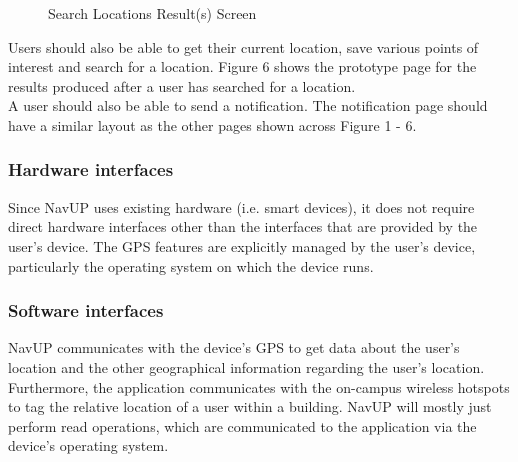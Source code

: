 \documentclass{article}
\begin{document}
\begin{figure}[H]
	\endminipage\hfill
	\caption{Search Locations Result(s) Screen}
	\endminipage\hfill
\end{figure}

Users should also be able to get their current location, save various points of interest and search for a location. Figure 6 shows the prototype page for the results produced after a user has searched for a location. \\

A user should also be able to send a notification. The notification page should have a similar layout as the other pages shown across Figure 1 - 6.
			\subsubsection{Hardware interfaces}
			Since NavUP uses existing hardware (i.e. smart devices), it does not require direct hardware interfaces other than the interfaces that are provided by the user's device. The GPS features are explicitly managed by the user's device, particularly the operating system on which the device runs.
			\subsubsection{Software interfaces}
			NavUP communicates with the device's GPS to get data about the user's location and the other geographical information regarding the user's location. Furthermore, the application communicates with the on-campus wireless hotspots to tag the relative location of a user within a building. NavUP will mostly just perform read operations, which are communicated to the application via the device's operating system.
\end{document}
